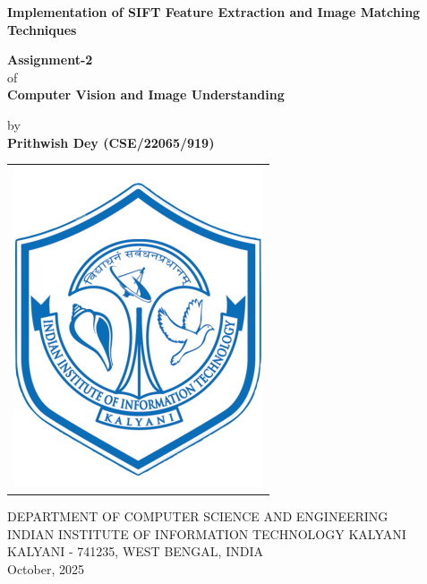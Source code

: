\documentclass[12pt,a4paper]{article}
\begin{document}
\thispagestyle{empty}
\pagestyle{empty}
\vspace*{-1.75cm}

\begin{center}
\begin{Large}
\vspace{3cm}
{\textbf{Implementation of SIFT Feature Extraction and Image Matching Techniques}}\\
\end{Large}
\end{center}

\vspace{0.2cm}
\begin{center}
 \begin{large}
 \textbf{Assignment-2}\\
 \vspace{0.3cm}
 of\\
 \textbf{Computer Vision and Image Understanding}\\
 
 \vspace{0.3cm}
 
 \end{large}
\end{center}

\begin{center}
 \begin{large}
 by\\
 \vspace{0.2cm}
 \textbf{Prithwish Dey (CSE/22065/919)}\\

 \vspace{2cm}
 \end{large}
\end{center}

\begin{center}
 \begin{tabular}{l}
 \includegraphics[width = 3.5 cm]{IIITK.png}
 \end{tabular}
\end{center}

\vspace{-0.3cm}
\begin{center}
\begin{large}
 \vspace{0.25cm}
 \hspace{-15mm} DEPARTMENT OF COMPUTER SCIENCE AND ENGINEERING\\
 \hspace{-15mm} INDIAN INSTITUTE OF INFORMATION TECHNOLOGY KALYANI\\
 KALYANI - 741235, WEST BENGAL, INDIA\\
 \vskip 28pt
 October, 2025
\end{large}
\end{center}
\end{document}
